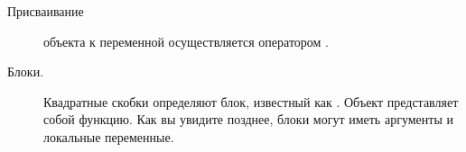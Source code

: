 \documentclass[a4paper,10pt,twoside]{book}
\begin{document}
\begin{description}

\item[Присваивание]	объекта к переменной осуществляется оператором \ct{:=}.


\item[Блоки.] Квадратные скобки \ct{[]} определяют блок, известный как .
	Объект  представляет собой функцию.
	Как вы увидите позднее, блоки могут иметь аргументы и локальные переменные.



\end{description}
\end{document}
